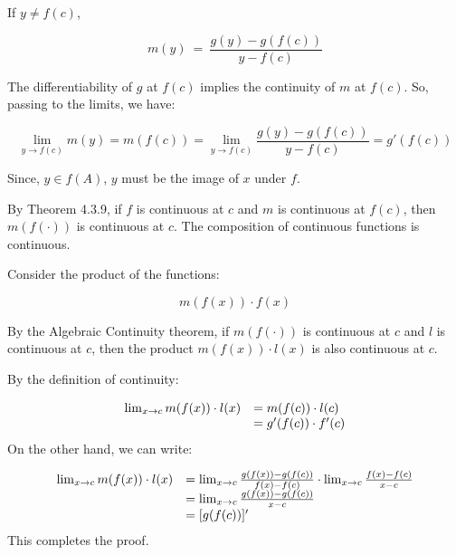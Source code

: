 \documentclass[10pt]{article}
\begin{document}
If $\displaystyle y\neq f( c)$,


\begin{equation*}
m( y) \ =\ \frac{g( y) -g( f( c))}{y-f( c)}
\end{equation*}


The differentiability of $\displaystyle g$ at $\displaystyle f( c)$ implies the continuity of $\displaystyle m$ at $\displaystyle f( c)$. So, passing to the limits, we have:


\begin{equation*}
\lim _{y\rightarrow f( c)} m( y) =m( f( c)) =\lim _{y\rightarrow f( c)}\frac{g( y) -g( f( c))}{y-f( c)} =g'( f( c))
\end{equation*}


Since, $\displaystyle y\in f( A)$, $\displaystyle y$ must be the image of $\displaystyle x$ under $\displaystyle f$. 



By Theorem 4.3.9, if $\displaystyle f$ is continuous at $\displaystyle c$ and $\displaystyle m$ is continuous at $\displaystyle f( c)$, then $\displaystyle m( f( \cdot ))$ is continuous at $\displaystyle c$. The composition of continuous functions is continuous.



Consider the product of the functions:


\begin{equation*}
m( f( x)) \cdot f( x)
\end{equation*}


By the Algebraic Continuity theorem, if $\displaystyle m( f( \cdot ))$ is continuous at $\displaystyle c$ and $\displaystyle l$ is continuous at $\displaystyle c$, then the product $\displaystyle m( f( x)) \cdot l( x)$ is also continuous at $\displaystyle c$.



By the definition of continuity:


\begin{equation*}
\begin{array}{ c l }
\lim _{x\rightarrow c} m( f( x)) \cdot l( x) & =m( f( c)) \cdot l( c)\\
 & =g'( f( c)) \cdot f'( c)
\end{array}
\end{equation*}
On the other hand, we can write:


\begin{equation*}
\begin{array}{ c l }
\lim _{x\rightarrow c} m( f( x)) \cdot l( x) & =\lim _{x\rightarrow c}\frac{g( f( x)) -g( f( c))}{f( x) -f( c)} \cdot \lim _{x\rightarrow c}\frac{f( x) -f( c)}{x-c}\\
 & =\lim _{x\rightarrow c}\frac{g( f( x)) -g( f( c))}{x-c}\\
 & =[ g( f( c))] '
\end{array}
\end{equation*}
This completes the proof.
\end{document}
